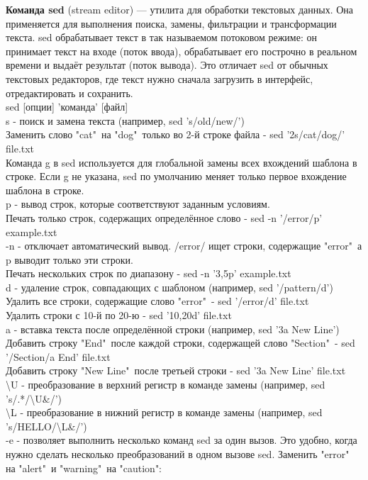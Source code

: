 \noindent \textbf{Команда sed} (stream editor) — утилита для обработки текстовых данных. Она применяется для выполнения поиска, замены, фильтрации и трансформации текста. sed обрабатывает текст в так называемом потоковом режиме: он принимает текст на входе (поток ввода), обрабатывает его построчно в реальном времени и выдаёт результат (поток вывода). Это отличает sed от обычных текстовых редакторов, где текст нужно сначала загрузить в интерфейс, отредактировать и сохранить. \\
sed [опции] 'команда' [файл] \\
s - поиск и замена текста (например, sed 's/old/new/') \\
Заменить слово "cat"\, на "dog"\, только во 2-й строке файла - sed '2s/cat/dog/' file.txt \\
Команда g в sed используется для глобальной замены всех вхождений шаблона в строке. Если g не указана, sed по умолчанию меняет только первое вхождение шаблона в строке. \\
p - вывод строк, которые соответствуют заданным условиям. \\
Печать только строк, содержащих определённое слово - sed -n '/error/p' example.txt \\
-n - отключает автоматический вывод. /error/ ищет строки, содержащие "error"\, а p выводит только эти строки. \\
Печать нескольких строк по диапазону - sed -n '3,5p' example.txt \\
d - удаление строк, совпадающих с шаблоном (например, sed '/pattern/d') \\
Удалить все строки, содержащие слово "error"\, - 
sed '/error/d' file.txt \\
Удалить строки с 10-й по 20-ю - sed '10,20d' file.txt \\
a - вставка текста после определённой строки (например, sed '3a New Line') \\
Добавить строку "End"\, после каждой строки, содержащей слово "Section"\, - sed '/Section/a End' file.txt \\
Добавить строку "New Line"\, после третьей строки - sed '3a New Line' file.txt \\
\textbackslash U - преобразование в верхний регистр в команде замены (например, sed 's/.*/\textbackslash U\&/') \\
\textbackslash L - преобразование в нижний регистр в команде замены (например, sed 's/HELLO/\textbackslash L\&/') \\
-e - позволяет выполнить несколько команд sed за один вызов. Это удобно, когда нужно сделать несколько преобразований в одном вызове sed. Заменить "error"\, на "alert"\, и "warning"\, на "caution": \\
